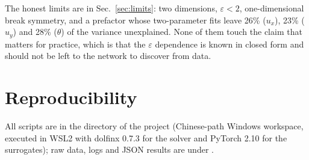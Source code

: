 \documentclass[11pt,a4paper]{article}
\begin{document}
The honest limits are in Sec.~\ref{sec:limits}: two dimensions, $\varepsilon<2$, one-dimensional
break symmetry, and a prefactor whose two-parameter fits leave 26\% ($u_x$), 23\% ($u_y$) and 28\%
($\theta$) of the variance unexplained. None of them touch the claim that matters for practice,
which is that the $\varepsilon$ dependence is known in closed form and should not be left to the
network to discover from data.

\section{Reproducibility}
\label{sec:repro}

All scripts are in the  directory of the project (Chinese-path Windows workspace,
executed in WSL2 with dolfinx 0.7.3 for the solver and PyTorch 2.10 for the surrogates); raw data,
logs and JSON results are under .
\end{document}
